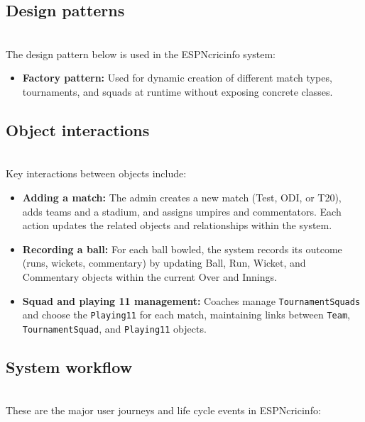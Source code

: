 \subsection{Design patterns}\label{jVUP5NlgQm4zfpat0z__f}
\\
The design pattern below is used in the ESPNcricinfo system:

\begin{itemize}
\item
\protect{}\label{mkNDwFGYiCaTPPQi3Nfpj}
\textbf{Factory pattern:} Used for dynamic creation of different match types, tournaments, and squads at runtime without exposing concrete classes.
\end{itemize}

\subsection{Object interactions}\label{Kd2gMrma29SZhsHNzgmpO}
\\
Key interactions between objects include:

\begin{itemize}
\item
\protect{}\label{AtxVMYFEu49SHh_CQXt-u}
\textbf{Adding a match:} The admin creates a new match (Test, ODI, or T20), adds teams and a stadium, and assigns umpires and commentators. Each action updates the related objects and relationships within the system.
\item
\protect{}\label{Hf2T9AI5XM9kdZmlgjIam}
\textbf{Recording a ball:} For each ball bowled, the system records its outcome (runs, wickets, commentary) by updating Ball, Run, Wicket, and Commentary objects within the current Over and Innings.
\item
\protect{}\label{McUD_aMuYPulPkTCRQnrG}
\textbf{Squad and playing 11 management:} Coaches manage \texttt{TournamentSquads} and choose the \texttt{Playing11} for each match, maintaining links between \texttt{Team}, \texttt{TournamentSquad}, and \texttt{Playing11} objects.
\end{itemize}

\subsection{System workflow}\label{GQ8rSViMyaCGe6Ez8h16C}
\\
These are the major user journeys and life cycle events in ESPNcricinfo:

